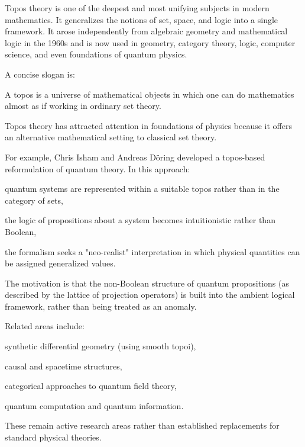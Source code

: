 
Topos theory is one of the deepest and most unifying subjects in modern mathematics. It generalizes the notions of set, space, and logic into a single framework. It arose independently from algebraic geometry and mathematical logic in the 1960s and is now used in geometry, category theory, logic, computer science, and even foundations of quantum physics.

A concise slogan is:

A topos is a universe of mathematical objects in which one can do mathematics almost as if working in ordinary set theory.

Topos theory has attracted attention in foundations of physics because it offers an alternative mathematical setting to classical set theory.

For example, Chris Isham and Andreas Döring developed a topos-based reformulation of quantum theory. In this approach:

quantum systems are represented within a suitable topos rather than in the category of sets,

the logic of propositions about a system becomes intuitionistic rather than Boolean,

the formalism seeks a "neo-realist" interpretation in which physical quantities can be assigned generalized values.

The motivation is that the non-Boolean structure of quantum propositions (as described by the lattice of projection operators) is built into the ambient logical framework, rather than being treated as an anomaly.

Related areas include:

synthetic differential geometry (using smooth topoi),

causal and spacetime structures,

categorical approaches to quantum field theory,

quantum computation and quantum information.

These remain active research areas rather than established replacements for standard physical theories.

